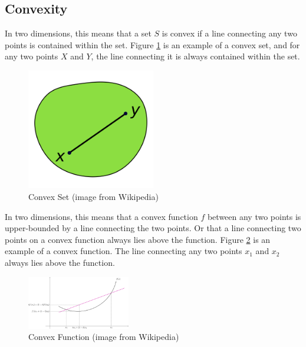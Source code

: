 \documentclass[11pt]{article}
\begin{document}
\subsection{Convexity}

\normalfont
In two dimensions, this means that a set $S$ is convex if a line connecting any two points is contained within the set. Figure \ref{fig:convex_set} is an example of a convex set, and for any two points $X$ and $Y$, the line connecting it is always contained within the set.

\begin{figure}[ht]
    \centering
    \includegraphics[width=0.5\textwidth]{convex_set}
    \caption{Convex Set (image from Wikipedia)}
    \label{fig:convex_set}
\end{figure}


\normalfont
In two dimensions, this means that a convex function $f$ between any two points is upper-bounded by a line connecting the two points. Or that a line connecting two points on a convex function always lies above the function. Figure \ref{fig:convex_function} is an example of a convex function. The line connecting any two points $x_1$ and $x_2$ always lies above the function.

\begin{figure}[ht]
    \centering
    \includegraphics[width=0.4\textwidth]{convex_function}
    \caption{Convex Function (image from Wikipedia)}
    \label{fig:convex_function}
\end{figure}
\end{document}
